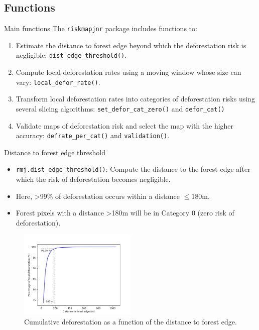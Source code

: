 \documentclass[10pt,table,dvipsnames,compress]{beamer}
\begin{document}
\subsection{Functions}
\label{sec:org297bd4e}

\begin{frame}[label={sec:orgd5d2b9f},fragile]{Main functions}
 The \texttt{riskmapjnr} package includes functions to:

\begin{enumerate}
\item Estimate the distance to forest edge beyond which the deforestation risk is negligible:
\texttt{dist\_edge\_threshold()}.
\item Compute local deforestation rates using a moving window whose size can vary:
\texttt{local\_defor\_rate()}.
\item Transform local deforestation rates into categories of deforestation risks using several slicing algorithms:
\texttt{set\_defor\_cat\_zero()} and \texttt{defor\_cat()}
\item Validate maps of deforestation risk and select the map with the higher accuracy:
\texttt{defrate\_per\_cat()} and \texttt{validation()}.
\end{enumerate}
\end{frame}

\begin{frame}[label={sec:orgdd703f7},fragile]{Distance to forest edge threshold}
 \begin{itemize}
\item \texttt{rmj.dist\_edge\_threshold()}: Compute the distance to the forest edge after which the risk of deforestation becomes negligible.
\item Here, >99\% of deforestation occurs within a distance \(\le\)180m.
\item Forest pixels with a distance >180m will be in Category 0 (zero risk of deforestation).
\end{itemize}

\begin{figure}[htbp]
\centering
\includegraphics[width=0.5\textwidth]{figs/perc_dist.png}
\caption{\label{fig:orgbb2e15d}Cumulative deforestation as a function of the distance to forest edge.}
\end{figure}
\end{frame}
\end{document}
